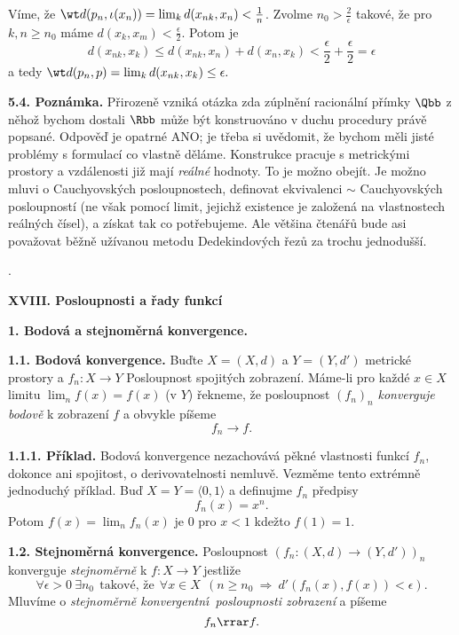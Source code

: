 \documentclass[12pt]{article}
\begin{document}
 
 Víme, že $\wt d(p_n,\iota(x_n))=\lim_k d(x_{nk},x_n)<\frac1n$. Zvolme $n_0>\frac{2}{\epsilon}$ takové, že pro $k,n\geq n_0$ máme $d(x_k,x_m)<\frac{\epsilon}{2}$. Potom je
 $$
d(x_{nk},x_k)\leq d(x_{nk},x_n)+d(x_n,x_k)<\frac{\epsilon}{2}+\frac{\epsilon}{2}=\epsilon
$$
a tedy 
$\wt d(p_n,p)=\lim_kd(x_{nk},x_k)\leq \epsilon.$\sq

\bigskip

{\bf 5.4. Poznámka.} Přirozeně vzniká otázka zda zúplnění  racionální přímky $\Qbb$ z n\v ehož bychom dostali
 $\Rbb$ může být konstruováno v duchu procedury právě popsané. Odpověď je opatrné ANO;  je třeba si uvědomit, že bychom měli jisté problémy s formulací co vlastně děláme. Konstrukce pracuje s metrickými prostory a vzdálenosti
již mají {\em reálné} hodnoty. To je možno obejít. Je možno mluvi o Cauchyovských posloupnostech, definovat ekvivalenci $\sim$ Cauchyovských posloupností (ne však pomocí limit, jejichž existence je založená na vlastnostech reálných čísel), a získat tak co potřebujeme. Ale většina čtenářů bude asi považovat běžně užívanou metodu Dedekindových řezů za trochu jednodušší.

\newpage

.

\newpage 


 
 \centerline{\Large\bf XVIII. Posloupnosti a řady funkcí} 
 
 \vskip10mm
 
 
 \def\d{\text{d}}
 
 
 
 {\large\bf 1. Bodová a stejnoměrná konvergence.}
 
 \bigskip
 
 {\bf 1.1. Bodová konvergence.} Buďte  $X=(X,d)$ a $Y=(Y,d')$ metrické prostory a  $f_n:X\to Y$ Posloupnost spojitých zobrazení. Máme-li pro každé $x\in X$ limitu $\lim_nf(x)=f(x)$ (v $Y$) řekneme, že posloupnost $(f_n)_n$ {\em  konverguje bodově} k zobrazení $f$ a obvykle píšeme
 $$
 f_n\to f.
 $$ 
 
 
 \medskip
 
 {\bf 1.1.1. Příklad.} Bodová konvergence  nezachovává pěkné vlastnosti funkcí $f_n$, dokonce ani spojitost, o derivovatelnosti nemluvě. Vezměme tento extrémně jednoduchý příklad. Buď $X=Y=\langle 0,1\rangle$
 a definujme $f_n$ předpisy
 $$
 f_n(x)= x^n.
 $$
 Potom $f(x)=\lim_nf_n(x)$ je $0$ pro $x<1$ kdežto $f(1)=1$.
 
 \bigskip
 
 {\bf 1.2. Stejnoměrná konvergence.} Posloupnost $(f_n:(X,d)\to (Y,d'))_n$  konverguje {\em stejnoměrně} k $f:X\to Y$
 jestliže
 $$
 \forall \epsilon>0\ \exists n_0\ \ \text{takové, že}\ \ \forall x\in X \ \ (n\geq n_0\ \Rightarrow \
 d'(f_n(x),f(x))<\epsilon).
 $$
 Mluvíme o  {\em stejnoměrně konvergentn\'\i\ posloupnosti zobrazení} a píšeme
 $$
 f_n\rrar f.
 $$
 
\end{document}

